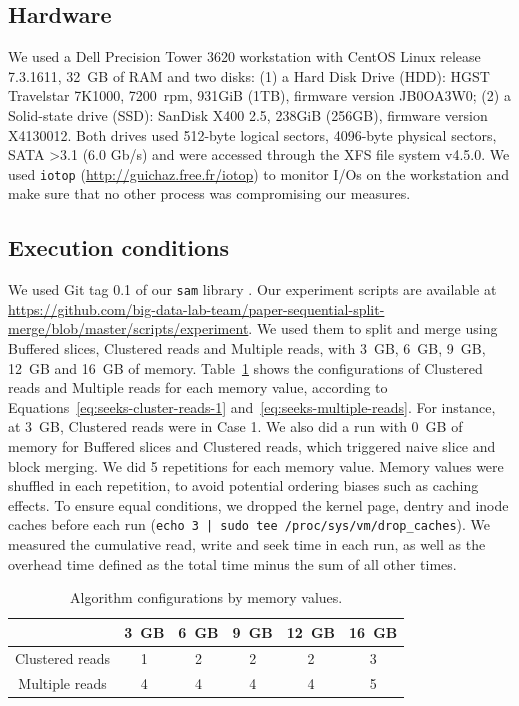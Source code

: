 \documentclass[10pt, conference, compsocconf]{IEEEtran}
\newcommand{\todo}[1]{\marginpar{\parbox{18mm}{\flushleft\tiny\color{red}\textbf{TODO}:
      #1}}}
\begin{document}
\subsection{Hardware}

We used a Dell Precision Tower 3620 workstation with CentOS Linux
release 7.3.1611, 32~GB of RAM and two disks: (1) a Hard Disk Drive
(HDD): HGST Travelstar 7K1000, 7200~rpm, 931GiB (1TB), firmware
version JB0OA3W0; (2) a Solid-state drive (SSD): SanDisk X400 2.5,
238GiB (256GB), firmware version X4130012.  Both drives used 512-byte
logical sectors, 4096-byte physical sectors, SATA \textgreater 3.1 (6.0 Gb/s) and
were accessed through the XFS file system v4.5.0. We used
\texttt{iotop} (\url{http://guichaz.free.fr/iotop}) to monitor I/Os on
the workstation and make sure that no other process was compromising
our measures.

\subsection{Execution conditions}

We used Git tag 0.1 of our \texttt{sam} library \todo{tag it}. Our
experiment scripts are available at
\url{https://github.com/big-data-lab-team/paper-sequential-split-merge/blob/master/scripts/experiment}. We
used them to split and merge using Buffered slices, Clustered reads and
Multiple reads, with 3~GB, 6~GB, 9~GB, 12~GB and 16~GB of
memory. Table~\ref{table:configs} shows the configurations of Clustered
reads and Multiple reads for each memory value, according to
Equations~\ref{eq:seeks-cluster-reads-1}
and~\ref{eq:seeks-multiple-reads}. For instance, at 3~GB, Clustered reads were in
Case 1. We also did a run with 0~GB of memory for Buffered slices and
Clustered reads, which triggered naive slice and block merging. We did 5
repetitions for each memory value. Memory values were shuffled in each
repetition, to avoid potential ordering biases such
as caching effects. To ensure equal conditions, we dropped the kernel
page, dentry and inode caches before each run (\texttt{echo 3 | sudo
  tee /proc/sys/vm/drop\_caches}). We measured the cumulative read,
write and seek time in each run, as well as the overhead time defined
as the total time minus the sum of all other times.
\begin{table}
  \centering
\begin{footnotesize}
\begin{tabular}{|c|ccccc|}
  \hline
                 & 3~GB & 6~GB & 9~GB & 12~GB & 16~GB\\
  \hline
  Clustered  reads &  1 &  2 &  2 &  2 &  3 \\
  Multiple reads &  4 &  4 &  4 &  4 &  5\\
  \hline
\end{tabular}
\end{footnotesize}
\caption{Algorithm configurations by memory values.}
\label{table:configs}
\end{table}
\end{document}
